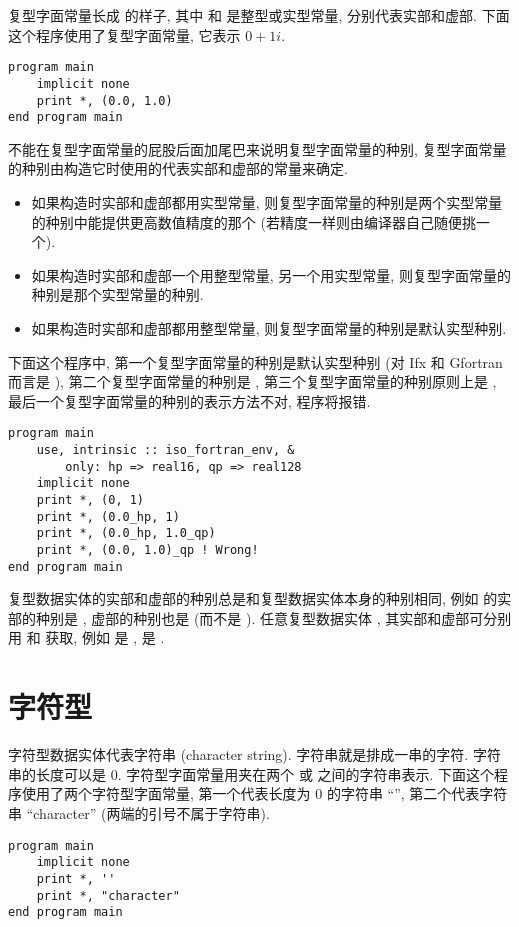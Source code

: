 复型字面常量长成 \ttt{([real], [imag])}的样子, 其中 \ttt{[real]} 和 \ttt{[imag]}是整型或实型常量, 分别代表实部和虚部. 下面这个程序使用了复型字面常量, 它表示 $0+1i$.
\begin{lstlisting}
program main
    implicit none
    print *, (0.0, 1.0)
end program main
\end{lstlisting}

不能在复型字面常量的屁股后面加尾巴来说明复型字面常量的种别, 复型字面常量的种别由构造它时使用的代表实部和虚部的常量来确定.
\begin{itemize}
    \item 如果构造时实部和虚部都用实型常量, 则复型字面常量的种别是两个实型常量的种别中能提供更高数值精度的那个 (若精度一样则由编译器自己随便挑一个).
    \item 如果构造时实部和虚部一个用整型常量, 另一个用实型常量, 则复型字面常量的种别是那个实型常量的种别.
    \item 如果构造时实部和虚部都用整型常量, 则复型字面常量的种别是默认实型种别.
\end{itemize}
下面这个程序中, 第一个复型字面常量的种别是默认实型种别 (对 Ifx 和 Gfortran 而言是 ), 第二个复型字面常量的种别是 , 第三个复型字面常量的种别原则上是 , 最后一个复型字面常量的种别的表示方法不对, 程序将报错.
\begin{lstlisting}
program main
    use, intrinsic :: iso_fortran_env, &
        only: hp => real16, qp => real128
    implicit none
    print *, (0, 1)
    print *, (0.0_hp, 1)
    print *, (0.0_hp, 1.0_qp)
    print *, (0.0, 1.0)_qp ! Wrong!
end program main
\end{lstlisting}

复型数据实体的实部和虚部的种别总是和复型数据实体本身的种别相同, 例如  的实部的种别是 , 虚部的种别也是  (而不是 ). 任意复型数据实体 \ttt{[z]}, 其实部和虚部可分别用  和  获取, 例如  是 ,  是 .

\section{字符型}\label{fortran_char}

字符型数据实体代表字符串 (character string). 字符串就是排成一串的字符. 字符串的长度可以是 $0$. 字符型字面常量用夹在两个  或  之间的字符串表示. 下面这个程序使用了两个字符型字面常量, 第一个代表长度为 $0$ 的字符串 ``'', 第二个代表字符串 ``character'' (两端的引号不属于字符串).
\begin{lstlisting}
program main
    implicit none
    print *, ''
    print *, "character"
end program main
\end{lstlisting}

